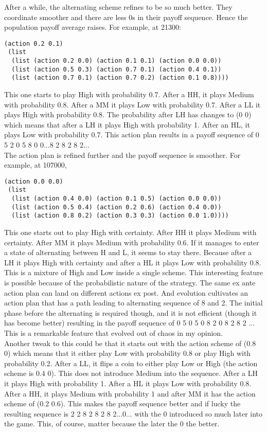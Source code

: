 \documentclass[12.5pt]{report}
\begin{document}
After a while, the alternating scheme refines to be so much better. They coordinate smoother and there are less 0s in their payoff sequence. Hence the population payoff average raises. For example, at 21300:

\begin{verbatim}
(action 0.2 0.1)
 (list
  (list (action 0.2 0.0) (action 0.1 0.1) (action 0.0 0.0))
  (list (action 0.5 0.3) (action 0.7 0.1) (action 0.4 0.1))
  (list (action 0.7 0.1) (action 0.7 0.2) (action 0.1 0.8))))
\end{verbatim}

This one starts to play High with probability 0.7. After a HH, it plays Medium with probability 0.8. After a MM it plays Low with probability 0.7. After a LL it plays High with probability 0.8. The probability after LH has changes to (0 0) which means that after a LH it plays High with probability 1. After an HL, it plays Low with probability 0.7. This action plan results in a payoff sequence of 0 5 2 0 5 8 0 0...8 2 8 2 8 2...\\

The action plan is refined further and the payoff sequence is smoother. For example, at 107000, 
\begin{verbatim}
(action 0.0 0.0)
 (list
  (list (action 0.4 0.0) (action 0.1 0.5) (action 0.0 0.0))
  (list (action 0.5 0.4) (action 0.2 0.6) (action 0.4 0.0))
  (list (action 0.8 0.2) (action 0.3 0.3) (action 0.0 1.0))))
\end{verbatim}

This one starts out to play High with certainty. After HH it plays Medium with certainty. After MM it plays Medium with probability 0.6. If it manages to enter a state of alternating between H and L, it seems to stay there. Because after a LH it plays High with certainty and after a HL it plays Low with probability 0.8. This is a mixture of High and Low inside a single scheme. This interesting feature is possible because of the probabilistic nature of the strategy. The same ex ante action plan can land on different actions ex post. And evolution cultivates an action plan that has a path leading to alternating sequence of 8 and 2. The initial phase before the alternating is required though, and it is not efficient (though it has become better) resulting in the payoff sequence of 0 5 0 5 0 8 2 0 8 2 8 2 ... This is a remarkable feature that evolved out of chaos in my opinion.\\

Another tweak to this could be that it starts out with the action scheme of (0.8 0) which means that it either play Low with probability 0.8 or play High with probability 0.2. After a LL, it flips a coin  to either play Low or High (the action scheme is 0.4 0). This does not introduce Medium into the sequence. After a LH it plays High with probability 1. After a HL it plays Low with probability 0.8. After a HH, it plays Medium with probability 1 and after MM it has the action scheme of (0.2 0.6). This makes the payoff sequence better and if lucky the resulting sequence is 2 2 8 2 8 2 8 2...0... with the 0 introduced so much later into the game. This, of course, matter because the later the 0 the better. \\
\end{document}

